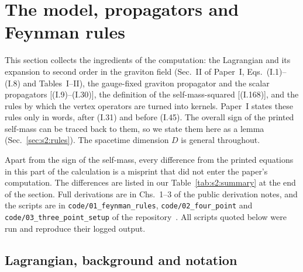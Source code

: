 \documentclass[aps,prd,onecolumn,10pt,nofootinbib,floatfix]{revtex4-2}
\newcommand{\PI}{Paper~I}
\newcommand{\eqI}[1]{(I.#1)}
\begin{document}
\providecommand{\sIIdel}{\delta^D(x-x')}
\providecommand{\sIIdd}{\partial_1\!\cdot\partial_2}
\providecommand{\sIIdp}{\partial\phi\!\cdot\!\partial\phi}
\providecommand{\sIIN}{\mathcal N}
\providecommand{\sIIcode}[1]{\texttt{code/#1}}

\section{The model, propagators and Feynman rules}
\label{sec:s2}

This section collects the ingredients of the computation: the Lagrangian and
its expansion to second order in the graviton field (Sec.~II of \PI,
Eqs.~\eqI{1}--\eqI{8} and Tables~I--II), the gauge-fixed graviton propagator
and the scalar propagators [\eqI{9}--\eqI{30}], the definition of the
self-mass-squared [\eqI{168}], and the rules by which the vertex operators
are turned into kernels. \PI{} states these rules only in words, after
\eqI{31} and before \eqI{45}. The overall sign of the printed self-mass can
be traced back to them, so we state them here as a lemma
(Sec.~\ref{sec:s2:rules}). The spacetime dimension $D$ is general
throughout.

Apart from the sign of the self-mass, every difference from the printed
equations in this part of the calculation is a misprint that did not enter
the paper's computation. The differences are listed in
our Table~\ref{tab:s2:summary} at the end of the section. Full derivations are
in Chs.~1--3 of the public derivation notes, and the scripts are in
\sIIcode{01\_feynman\_rules}, \sIIcode{02\_four\_point} and
\sIIcode{03\_three\_point\_setup} of the repository~\cite{ref:repo}. All
scripts quoted below were run and reproduce their logged output.

\subsection{Lagrangian, background and notation}
\label{sec:s2:lagrangian}
\end{document}
